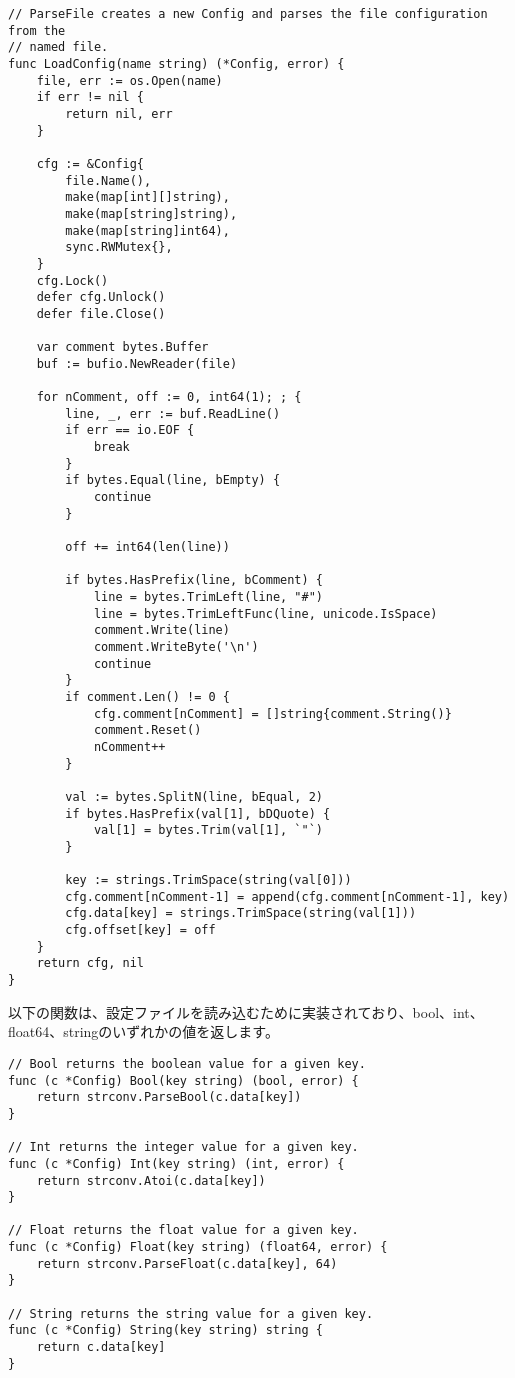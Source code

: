 \begin{lstlisting}[numbers=none]
// ParseFile creates a new Config and parses the file configuration from the
// named file.
func LoadConfig(name string) (*Config, error) {
    file, err := os.Open(name)
    if err != nil {
        return nil, err
    }

    cfg := &Config{
        file.Name(),
        make(map[int][]string),
        make(map[string]string),
        make(map[string]int64),
        sync.RWMutex{},
    }
    cfg.Lock()
    defer cfg.Unlock()
    defer file.Close()

    var comment bytes.Buffer
    buf := bufio.NewReader(file)

    for nComment, off := 0, int64(1); ; {
        line, _, err := buf.ReadLine()
        if err == io.EOF {
            break
        }
        if bytes.Equal(line, bEmpty) {
            continue
        }

        off += int64(len(line))

        if bytes.HasPrefix(line, bComment) {
            line = bytes.TrimLeft(line, "#")
            line = bytes.TrimLeftFunc(line, unicode.IsSpace)
            comment.Write(line)
            comment.WriteByte('\n')
            continue
        }
        if comment.Len() != 0 {
            cfg.comment[nComment] = []string{comment.String()}
            comment.Reset()
            nComment++
        }

        val := bytes.SplitN(line, bEqual, 2)
        if bytes.HasPrefix(val[1], bDQuote) {
            val[1] = bytes.Trim(val[1], `"`)
        }

        key := strings.TrimSpace(string(val[0]))
        cfg.comment[nComment-1] = append(cfg.comment[nComment-1], key)
        cfg.data[key] = strings.TrimSpace(string(val[1]))
        cfg.offset[key] = off
    }
    return cfg, nil
}
\end{lstlisting}

以下の関数は、設定ファイルを読み込むために実装されており、bool、int、float64、stringのいずれかの値を返します。

\begin{lstlisting}[numbers=none]
// Bool returns the boolean value for a given key.
func (c *Config) Bool(key string) (bool, error) {
    return strconv.ParseBool(c.data[key])
}

// Int returns the integer value for a given key.
func (c *Config) Int(key string) (int, error) {
    return strconv.Atoi(c.data[key])
}

// Float returns the float value for a given key.
func (c *Config) Float(key string) (float64, error) {
    return strconv.ParseFloat(c.data[key], 64)
}

// String returns the string value for a given key.
func (c *Config) String(key string) string {
    return c.data[key]
}
\end{lstlisting}
